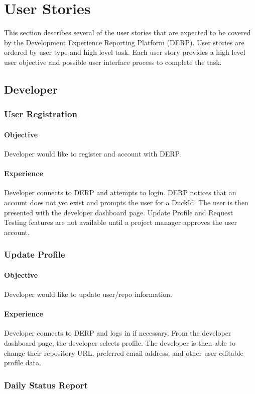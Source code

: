\chapter*{User Stories}
This section describes several of the user stories that are expected to be covered by the Development Experience Reporting Platform (DERP). User stories are ordered by user type and high level task. Each user story provides a high level user objective and possible user interface process to complete the task.

\section*{Developer}
\subsection*{User Registration}
\subsubsection*{Objective}
Developer would like to register and account with DERP.
\subsubsection*{Experience}
Developer connects to DERP and attempts to login. DERP notices that an account does not yet exist and prompts the user for a DuckId. The user is then presented with the developer dashboard page. Update Profile and Request Testing features are not available until a project manager approves the user account.


\subsection*{Update Profile}
\subsubsection*{Objective}
Developer would like to update user/repo information.
\subsubsection*{Experience}
Developer connects to DERP and logs in if necessary. From the developer dashboard page, the developer selects profile. The developer is then able to change their repository URL, preferred email address, and other user editable profile data.


\subsection*{Daily Status Report}

